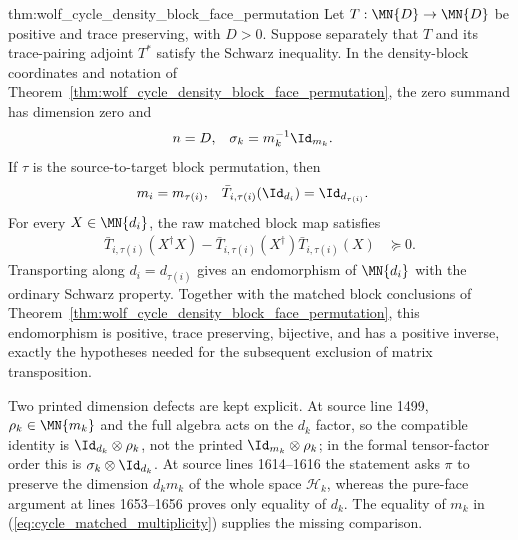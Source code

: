 \begin{theorem}
{        thm:wolf_cycle_density_block_face_permutation}
    Let $T:\MN{D}\to\MN{D}$ be positive and trace preserving, with $D>0$.
    Suppose separately that $T$ and its trace-pairing adjoint $T^*$ satisfy
    the Schwarz inequality. In the density-block coordinates and notation of
    Theorem~\ref{thm:wolf_cycle_density_block_face_permutation}, the zero
    summand has dimension zero and
    \begin{align}
        n&=D, &
        \sigma_k&=m_k^{-1}\Id_{m_k}. \label{eq:cycle_mixed_weights}
    \end{align}
    If $\tau$ is the source-to-target block permutation, then
    \begin{align}
        m_i&=m_{\tau(i)}, &
        \bar T_{i,\tau(i)}(\Id_{d_i})&=\Id_{d_{\tau(i)}}. \label{eq:cycle_matched_multiplicity}
    \end{align}
    For every $X\in\MN{d_i}$, the raw matched block map satisfies
    \begin{align}
        \bar T_{i,\tau(i)}(X^\dagger X)
        -\bar T_{i,\tau(i)}(X^\dagger)
         \bar T_{i,\tau(i)}(X)&\succeq0. \label{eq:cycle_raw_schwarz}
    \end{align}
    Transporting along $d_i=d_{\tau(i)}$ gives an endomorphism of
    $\MN{d_i}$ with the ordinary Schwarz property. Together with the matched
    block conclusions of
    Theorem~\ref{thm:wolf_cycle_density_block_face_permutation}, this
    endomorphism is positive, trace preserving, bijective, and has a positive
    inverse, exactly the hypotheses needed for the subsequent exclusion of
    matrix transposition.

    Two printed dimension defects are kept explicit. At source line 1499,
    $\rho_k\in\MN{m_k}$ and the full algebra acts on the $d_k$ factor, so the
    compatible identity is $\Id_{d_k}\otimes\rho_k$, not the printed
    $\Id_{m_k}\otimes\rho_k$; in the formal tensor-factor order this is
    $\sigma_k\otimes\Id_{d_k}$. At source lines 1614--1616 the statement asks
    $\pi$ to preserve the dimension $d_km_k$ of the whole space
    $\mathcal H_k$, whereas the pure-face argument at lines 1653--1656 proves
    only equality of $d_k$. The equality of $m_k$ in
    (\ref{eq:cycle_matched_multiplicity}) supplies the missing comparison.
\end{theorem}

